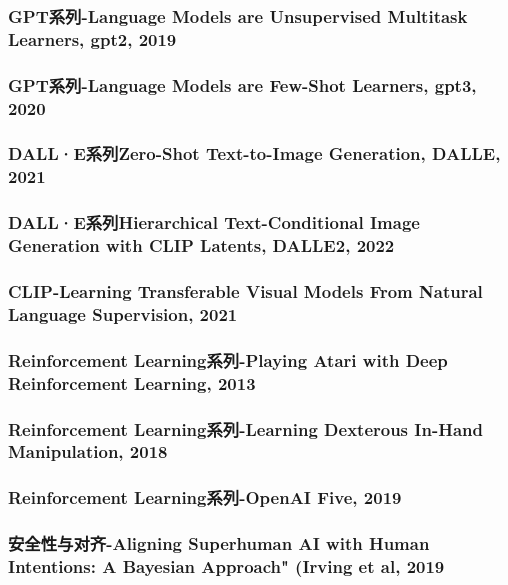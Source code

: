 \documentclass[twocolumn, 10pt]{article} %
\begin{document}
\subsubsection{GPT系列-Language Models are Unsupervised Multitask Learners, gpt2, 2019}

\subsubsection{GPT系列-Language Models are Few-Shot Learners, gpt3, 2020}


\subsubsection{DALL·E系列Zero-Shot Text-to-Image Generation, DALLE, 2021}

\subsubsection{DALL·E系列Hierarchical Text-Conditional Image Generation with CLIP Latents, DALLE2, 2022}

\subsubsection{CLIP-Learning Transferable Visual Models From Natural Language Supervision, 2021}


\subsubsection{Reinforcement Learning系列-Playing Atari with Deep Reinforcement Learning, 2013}


\subsubsection{Reinforcement Learning系列-Learning Dexterous In-Hand Manipulation, 2018}


\subsubsection{Reinforcement Learning系列-OpenAI Five, 2019}


\subsubsection{安全性与对齐-Aligning Superhuman AI with Human Intentions: A Bayesian Approach" (Irving et al, 2019}
\end{document}
